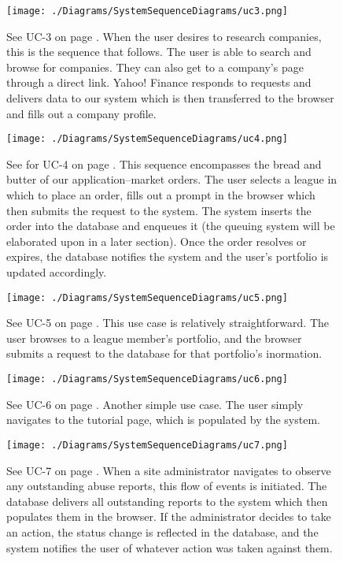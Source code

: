 \begin{figure}
\centering
\texttt{[image: ./Diagrams/SystemSequenceDiagrams/uc3.png]}
\caption{See UC-3 on page \pageref{UC-3}. When the user desires to research companies, this is the sequence that follows. The user is able to search and browse for companies. They can also get to a company's page through a direct link. Yahoo! Finance responds to requests and delivers data to our system which is then transferred to the browser and fills out a company profile.}
\end{figure}

\begin{figure}
\centering
\texttt{[image: ./Diagrams/SystemSequenceDiagrams/uc4.png]}
\caption{See for UC-4 on page \pageref{UC-4}. This sequence encompasses the bread and butter of our application--market orders. The user selects a league in which to place an order, fills out a prompt in the browser which then submits the request to the system. The system inserts the order into the database and enqueues it (the queuing system will be elaborated upon in a later section). Once the order resolves or expires, the database notifies the system and the user's portfolio is updated accordingly.}
\end{figure}

\begin{figure}
\centering
\texttt{[image: ./Diagrams/SystemSequenceDiagrams/uc5.png]}
\caption{See UC-5 on page \pageref{UC-5}. This use case is relatively straightforward. The user browses to a league member's portfolio, and the browser submits a request to the database for that portfolio's inormation.}
\end{figure}

\begin{figure}
\centering
\texttt{[image: ./Diagrams/SystemSequenceDiagrams/uc6.png]}
\caption{See UC-6 on page \pageref{UC-6}. Another simple use case. The user simply navigates to the tutorial page, which is populated by the system.}
\end{figure}

\begin{figure}
\centering
\texttt{[image: ./Diagrams/SystemSequenceDiagrams/uc7.png]}
\caption{See UC-7 on page \pageref{UC-7}. When a site administrator navigates to observe any outstanding abuse reports, this flow of events is initiated. The database delivers all outstanding reports to the system which then populates them in the browser. If the administrator decides to take an action, the status change is reflected in the database, and the system notifies the user of whatever action was taken against them.}
\end{figure}
\fi
